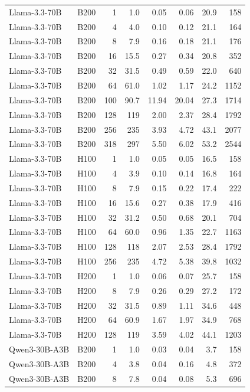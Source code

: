 \begin{longtable}{llrrrrrr}
Llama-3.3-70B & B200 & 1 & 1.0 & 0.05 & 0.06 & 20.9 & 158 \\
Llama-3.3-70B & B200 & 4 & 4.0 & 0.10 & 0.12 & 21.1 & 164 \\
Llama-3.3-70B & B200 & 8 & 7.9 & 0.16 & 0.18 & 21.1 & 176 \\
Llama-3.3-70B & B200 & 16 & 15.5 & 0.27 & 0.34 & 20.8 & 352 \\
Llama-3.3-70B & B200 & 32 & 31.5 & 0.49 & 0.59 & 22.0 & 640 \\
Llama-3.3-70B & B200 & 64 & 61.0 & 1.02 & 1.17 & 24.2 & 1152 \\
Llama-3.3-70B & B200 & 100 & 90.7 & 11.94 & 20.04 & 27.3 & 1714 \\
Llama-3.3-70B & B200 & 128 & 119 & 2.00 & 2.37 & 28.4 & 1792 \\
Llama-3.3-70B & B200 & 256 & 235 & 3.93 & 4.72 & 43.1 & 2077 \\
Llama-3.3-70B & B200 & 318 & 297 & 5.50 & 6.02 & 53.2 & 2544 \\
Llama-3.3-70B & H100 & 1 & 1.0 & 0.05 & 0.05 & 16.5 & 158 \\
Llama-3.3-70B & H100 & 4 & 3.9 & 0.10 & 0.14 & 16.8 & 164 \\
Llama-3.3-70B & H100 & 8 & 7.9 & 0.15 & 0.22 & 17.4 & 222 \\
Llama-3.3-70B & H100 & 16 & 15.6 & 0.27 & 0.38 & 17.9 & 416 \\
Llama-3.3-70B & H100 & 32 & 31.2 & 0.50 & 0.68 & 20.1 & 704 \\
Llama-3.3-70B & H100 & 64 & 60.0 & 0.96 & 1.35 & 22.7 & 1163 \\
Llama-3.3-70B & H100 & 128 & 118 & 2.07 & 2.53 & 28.4 & 1792 \\
Llama-3.3-70B & H100 & 256 & 235 & 4.72 & 5.38 & 39.8 & 1032 \\
Llama-3.3-70B & H200 & 1 & 1.0 & 0.06 & 0.07 & 25.7 & 158 \\
Llama-3.3-70B & H200 & 8 & 7.9 & 0.26 & 0.29 & 27.2 & 172 \\
Llama-3.3-70B & H200 & 32 & 31.5 & 0.89 & 1.11 & 34.6 & 448 \\
Llama-3.3-70B & H200 & 64 & 60.9 & 1.67 & 1.97 & 34.9 & 768 \\
Llama-3.3-70B & H200 & 128 & 119 & 3.59 & 4.02 & 44.1 & 1203 \\
Qwen3-30B-A3B & B200 & 1 & 1.0 & 0.03 & 0.04 & 3.7 & 158 \\
Qwen3-30B-A3B & B200 & 4 & 3.8 & 0.04 & 0.16 & 4.8 & 372 \\
Qwen3-30B-A3B & B200 & 8 & 7.8 & 0.04 & 0.08 & 5.3 & 696 \\

\end{longtable}
